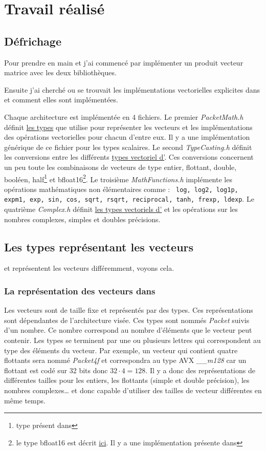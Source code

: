\section{Travail réalisé}

\subsection{Défrichage}

Pour prendre en main \Eigen et \MIPP j'ai commencé par implémenter un produit
vecteur matrice avec les deux bibliothèques.

Ensuite j'ai cherché ou se trouvait les implémentations vectorielles explicites dans \Eigen
et comment elles sont implémentées.

Chaque architecture est implémentée en 4 fichiers. Le premier \emph{PacketMath.h}
définit \hyperref[typeEigen]{les types} que \Eigen utilise pour représenter les
vecteurs et les implémentations des opérations vectorielles pour chacun d'entre eux.
Il y a une implémentation générique de ce fichier pour les types scalaires. Le second
\emph{TypeCasting.h} définit les conversions entre les différents \hyperref[typeEigen]{types
vectoriel d'\Eigen}. Ces conversions concernent un peu toute les combinaisons
de vecteurs de type entier, flottant, double, booléen, half\footnote{type présent dans
\Eigen} et bfloat16\footnote{le type bfloat16 est décrit
\href{https://en.wikipedia.org/wiki/Bfloat16_floating-point_format}{ici}. Il y a une
implémentation présente dans \Eigen}. Le troisième \emph{MathFunctions.h}
implémente les opérations mathématiques non élémentaires comme : \texttt{ log, log2, log1p,
expm1, exp, sin, cos, sqrt, rsqrt, reciprocal, tanh, frexp, ldexp}. Le quatrième
\emph{Complex.h} définit \hyperref[typeEigen]{les types vectoriels d'\Eigen} et
les opérations sur les nombres complexes, simples et doubles précisions.

\subsection{Les types représentant les vecteurs}
\Eigen et \MIPP représentent les vecteurs différemment, voyons cela.

\label{typeEigen}
\subsubsection{La représentation des vecteurs dans \Eigen}
{
  Les vecteurs sont de taille fixe et représentés par des types. Ces représentations sont
  dépendantes de l'architecture visée. Ces types sont nommés \emph{Packet} suivis d'un nombre.
  Ce nombre correspond au nombre d'éléments que le vecteur peut contenir. Les types se
  terminent par une ou plusieurs lettres qui correspondent au type des éléments du vecteur.
  Par exemple, un vecteur qui contient quatre flottants sera nommé \emph{Packet4f} et
  correspondra au type AVX \emph{__m128} car un flottant est codé sur 32 bits donc
  $32\cdot 4=128$. Il y a donc des représentations de différentes tailles pour les entiers,
  les flottants (simple et double précision), les nombres complexes\dots\space
  \Eigen et donc capable d'utiliser des tailles de vecteur différentes en même temps.
}

